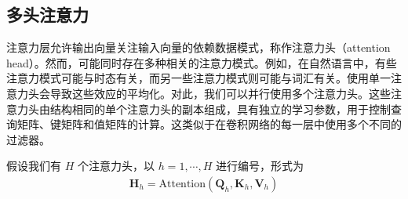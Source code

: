 \documentclass[../../main.tex]{subfiles}
\begin{document}
\begin{center}
\setlength{\fboxsep}{7pt}%
\end{center}

\subsection{多头注意力}\label{subsection:ch12-多头注意力}

注意力层允许输出向量关注输入向量的依赖数据模式，称作注意力头（attention head）。然而，可能同时存在多种相关的注意力模式。例如，在自然语言中，有些注意力模式可能与时态有关，而另一些注意力模式则可能与词汇有关。使用单一注意力头会导致这些效应的平均化。对此，我们可以并行使用多个注意力头。这些注意力头由结构相同的单个注意力头的副本组成，具有独立的学习参数，用于控制查询矩阵、键矩阵和值矩阵的计算。这类似于在卷积网络的每一层中使用多个不同的过滤器。

假设我们有 $H$ 个注意力头，以 $h=1,\cdots,H$ 进行编号，形式为
\begin{align}
\mathbf{H}_h=\mathrm{Attention}(\mathbf{Q}_h,\mathbf{K}_h,\mathbf{V}_h)
\label{align:ch12-单头注意力}
\end{align}
\end{document}
